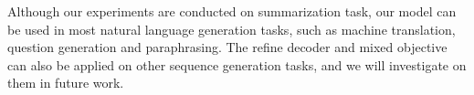 \documentclass{article}
\begin{document}
Although our experiments are conducted on summarization task, our model can be used in most natural language generation tasks, such as machine translation, question generation and paraphrasing.  The refine decoder and mixed objective can also be applied on other sequence generation tasks, and we will investigate on them in future work.



\end{document}
